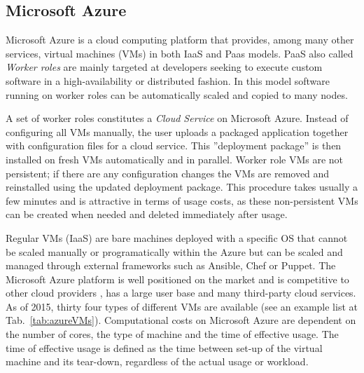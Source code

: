 \documentclass[3p,times]{elsarticle}
\begin{document}
\subsection{Microsoft Azure}

Microsoft Azure is a cloud computing platform that provides, among many other services, virtual machines (VMs) in both IaaS and Paas models. PaaS also called \textit{Worker roles} are mainly targeted at developers seeking to execute custom software in a high-availability or distributed fashion. In this model software running on worker roles can be automatically scaled and copied to many nodes. 

A set of worker roles constitutes a {\it Cloud Service} on Microsoft Azure. Instead of configuring all VMs manually, the user uploads a packaged application together with configuration files for a cloud service. This ''deployment package'' is then installed on fresh VMs automatically and in parallel. Worker role VMs are not persistent; if there are any configuration changes the VMs are removed and reinstalled using the updated deployment package. This procedure takes usually a few minutes and is attractive in terms of usage costs, as these non-persistent VMs can be created when needed and deleted immediately after usage. 

Regular VMs (IaaS) are bare machines deployed with a specific OS that cannot be scaled manually or programatically within the Azure but can be scaled and managed through external frameworks such as Ansible, Chef or Puppet. 
The Microsoft Azure platform is well positioned on the market and is competitive to other cloud providers \cite{cloudScores} \cite{twister4azure}, has a large user base and many third-party cloud services. As of 2015, thirty four types of different VMs are available (see an example list at Tab.~\ref{tab:azureVMs}). Computational costs on Microsoft Azure are dependent on the number of cores, the type of machine and the time of effective usage. The time of effective usage is defined as the time between set-up of the virtual machine and its tear-down, regardless of the actual usage or workload. 
\end{document}
